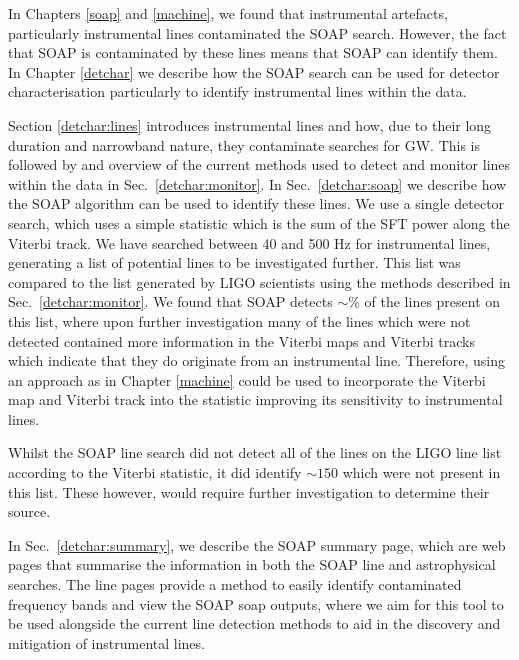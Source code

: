 \bigskip

In Chapters \ref{soap} and \ref{machine}, we found that instrumental artefacts, particularly instrumental lines contaminated the SOAP search.
However, the fact that SOAP is contaminated by these lines means that SOAP can identify them.
In Chapter \ref{detchar} we describe how the SOAP search can be used for detector characterisation particularly to identify instrumental lines within the data.

Section \ref{detchar:lines} introduces instrumental lines and how, due to their long duration and narrowband nature, they contaminate searches for \gls{GW}. 
This is followed by and overview of the current methods used to detect and monitor lines within the data in Sec.~\ref{detchar:monitor}.
In Sec.~\ref{detchar:soap} we describe how the SOAP algorithm can be used to identify these lines.
We use a single detector search, which uses a simple statistic which is the sum of the \gls{SFT} power along the Viterbi track. 
We have searched between 40 and 500 Hz for instrumental lines, generating a list of potential lines to be investigated further.
This list was compared to the list generated by \gls{LIGO} scientists using the methods described in Sec.~\ref{detchar:monitor}.
We found that SOAP detects $\sim $\% of the lines present on this list, where upon further investigation many of the lines which were not detected contained more information in the Viterbi maps and Viterbi tracks which indicate that they do originate from an instrumental line.
Therefore, using an approach as in Chapter \ref{machine} could be used to incorporate the Viterbi map and Viterbi track into the statistic improving its sensitivity to instrumental lines.

Whilst the SOAP line search did not detect all of the lines on the \gls{LIGO} line list according to the Viterbi statistic, it did identify $\sim 150$ which were not present in this list.
These however, would require further investigation to determine their source.

In Sec.~\ref{detchar:summary}, we describe the SOAP summary page, which are web pages that summarise the information in both the SOAP line and astrophysical searches.
The line pages provide a method to easily identify contaminated frequency bands and view the SOAP soap outputs, where we aim for this tool to be used alongside the current line detection methods to aid in the discovery and mitigation of instrumental lines.

\bigskip

